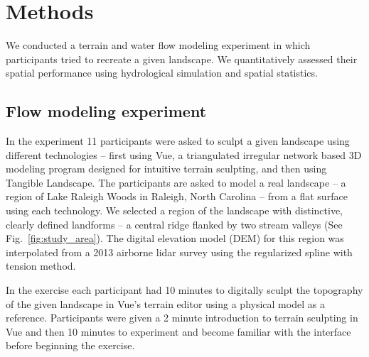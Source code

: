 \documentclass{isprs}
\begin{document}

\section{Methods}\label{sec:methods}
%
We conducted a terrain and water flow modeling experiment 
in which participants tried to recreate a given landscape. 
%
We quantitatively assessed their spatial performance using hydrological simulation and spatial statistics.


\subsection{Flow modeling experiment}
%
In the experiment 11 participants were asked to sculpt a given landscape using different technologies -- 
first using Vue, a triangulated irregular network based 3D modeling program designed for intuitive terrain sculpting, 
and then using Tangible Landscape. 
%
The participants are asked to model a real landscape --
a region of Lake Raleigh Woods 
in Raleigh, North Carolina  -- 
from a flat surface using each technology. 
We selected a region of the landscape with distinctive, 
clearly defined landforms -- a central ridge flanked by two stream valleys 
(See Fig.~\ref{fig:study_area}). 
The digital elevation model (DEM) for this region was interpolated from a 2013 airborne lidar survey using the regularized spline with tension method.


In the  exercise 
each participant had 10 minutes to digitally sculpt the topography of the given landscape in Vue's terrain editor
using a physical model as a reference. 
Participants were given a 2 minute introduction to terrain sculpting in Vue and then 10 minutes to experiment and become familiar with the interface before beginning the exercise.
\end{document}
